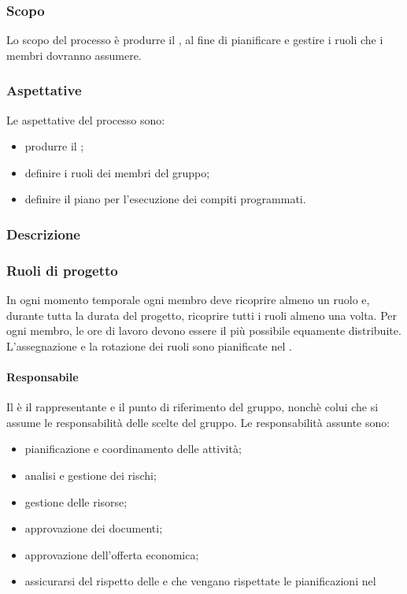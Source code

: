 \subsubsection{Scopo}
Lo scopo del processo è produrre il \PPdoc , al fine di pianificare e gestire i ruoli che i membri dovranno assumere.
\subsubsection{Aspettative}
Le aspettative del processo sono:
 \begin{itemize}
  \item produrre il \PPdoc ;
  \item definire i ruoli dei membri del gruppo;
  \item definire il piano per l'esecuzione dei compiti programmati.
 \end{itemize}
\subsubsection{Descrizione}
 
\subsubsection{Ruoli di progetto}
 In ogni momento temporale ogni membro deve ricoprire almeno un ruolo e, durante tutta la durata del progetto, ricoprire tutti i ruoli almeno una volta. Per ogni membro, le ore di lavoro devono essere il più possibile equamente distribuite. L'assegnazione e la rotazione dei ruoli sono pianificate nel \PPdocRR.
 \paragraph{Responsabile}
 Il \RESP{} è il rappresentante e il punto di riferimento del gruppo, nonchè colui che si assume le responsabilità delle scelte del gruppo.
 Le responsabilità assunte sono:
 \begin{itemize}
  \item pianificazione e coordinamento delle attività;
  \item analisi e gestione dei rischi;
  \item gestione delle risorse;
  \item approvazione dei documenti;
  \item approvazione dell'offerta economica;
  \item assicurarsi del rispetto delle \NPdoc{} e che vengano rispettate le pianificazioni nel \PPdoc
 \end{itemize}
